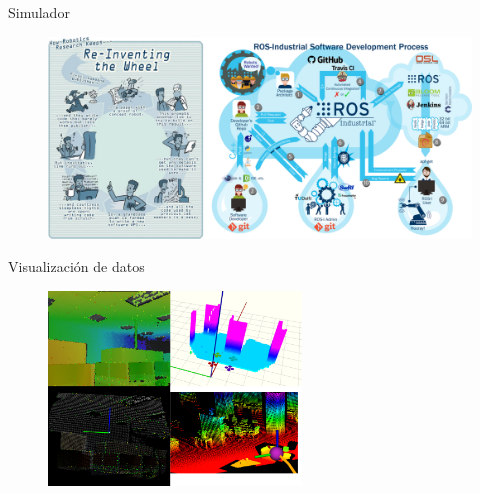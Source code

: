 \documentclass[
  24pt, %
  aspectratio=169, %
]{beamer}
\begin{document}
\begin{frame}{Simulador}
  \begin{figure}
    \centering
    \includegraphics[width=1\textwidth]{ros_problem}
  \end{figure}
\end{frame}

\begin{frame}{Visualización de datos}
  \begin{figure}
    \centering
    \includegraphics[width=0.6\textwidth]{visual}
  \end{figure}
\end{frame}
\end{document}

